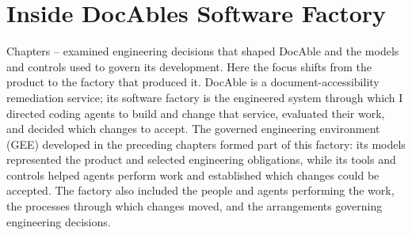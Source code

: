 


\chapter{Inside DocAble\textquotesingle s Software Factory}


Chapters -- examined engineering decisions that shaped DocAble and the models and controls used to govern its development. Here the focus shifts from the product to the factory that produced it. DocAble is a document-accessibility remediation service; its software factory is the engineered system through which I directed coding agents to build and change that service, evaluated their work, and decided which changes to accept. The governed engineering environment (GEE) developed in the preceding chapters formed part of this factory: its models represented the product and selected engineering obligations, while its tools and controls helped agents perform work and established which changes could be accepted. The factory also included the people and agents performing the work, the processes through which changes moved, and the arrangements governing engineering decisions.


